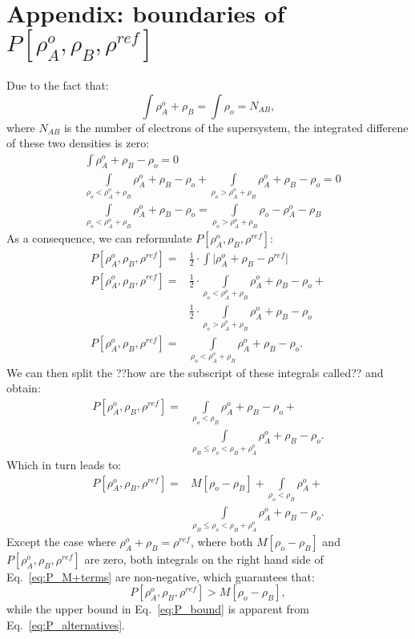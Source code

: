 \documentclass[journal=jctcce,manuscript=article, layout=twocolumn]{achemso}
\newcommand{\nr}[1]{\color{red}#1\color{black}}
\begin{document}
\section{Appendix: boundaries of $P[\rho^{o}_A, \rho_B, \rho^{ref}]$}
Due to the fact that:
\begin{equation}
 \int \rho^{o}_A + \rho_B = \int \rho_o = N_{AB},
\end{equation}
where $N_{AB}$ is the number of electrons of the supersystem, the integrated differene of these two densities is zero:
\begin{align}
 & \int \rho^{o}_A + \rho_B - \rho_o = 0 \\ \nonumber
 & \int\limits_{\rho_o <\rho^{o}_A + \rho_B}\rho^{o}_A + \rho_B - \rho_o + \int\limits_{\rho_o > \rho^{o}_A + \rho_B}\rho^{o}_A + \rho_B - \rho_o = 0 \\ \nonumber
 & \int\limits_{\rho_o < \rho^{o}_A + \rho_B}\rho^{o}_A + \rho_B - \rho_o = \int\limits_{\rho_o > \rho^{o}_A + \rho_B}\rho_o - \rho^{o}_A - \rho_B 
\end{align}
As a consequence, we can reformulate $P[\rho^{o}_A, \rho_B, \rho^{ref}]$:
\begin{align}\label{eq:P_alternatives}
P[\rho^{o}_A, \rho_B, \rho^{ref}] = & \frac{1}{2} \cdot \int \vert \rho^{o}_A + \rho_B - \rho^{ref} \vert \\ \nonumber
P[\rho^{o}_A, \rho_B, \rho^{ref}] = & \frac{1}{2} \cdot \int\limits_{\rho_o <\rho^{o}_A + \rho_B}\rho^{o}_A + \rho_B - \rho_o + \\ \nonumber
 & \frac{1}{2} \cdot \int\limits_{\rho_o > \rho^{o}_A + \rho_B}\rho^{o}_A + \rho_B - \rho_o \\ \nonumber
P[\rho^{o}_A, \rho_B, \rho^{ref}] = & \int\limits_{\rho_o <\rho^{o}_A + \rho_B}\rho^{o}_A + \rho_B - \rho_o.
\end{align}
We can then split the \nr{??how are the subscript of these integrals called??} and obtain:
\begin{align}
P[\rho^{o}_A, \rho_B, \rho^{ref}] = & \int\limits_{\rho_o < \rho_B}\rho^{o}_A + \rho_B - \rho_o + \\ \nonumber
 & \int\limits_{\rho_B \leq \rho_o < \rho_B + \rho^{o}_A}\rho^{o}_A + \rho_B - \rho_o.
\end{align}
Which in turn leads to:
\begin{align}\label{eq:P_M+terms}
 P[\rho^{o}_A, \rho_B, \rho^{ref}] =  &M[\rho_o - \rho_B] + \int\limits_{\rho_o < \rho_B}\rho^{o}_A + \\ \nonumber
 & \int\limits_{\rho_B \leq \rho_o < \rho_B + \rho^{o}_A}\rho^{o}_A + \rho_B - \rho_o.
\end{align}
Except the case where $\rho^{o}_A + \rho_B = \rho^{ref}$, where both $M[\rho_o - \rho_B]$ and $P[\rho^{o}_A, \rho_B, \rho^{ref}]$ are zero, both integrals on the right hand side of Eq.~\ref{eq:P_M+terms} are non-negative, which guarantees that:
\begin{equation}
 P[\rho^{o}_A, \rho_B, \rho^{ref}] > M[\rho_o - \rho_B],
\end{equation}
while the upper bound in Eq.~\ref{eq:P_bound} is apparent from Eq.~\ref{eq:P_alternatives}.
\end{document}
